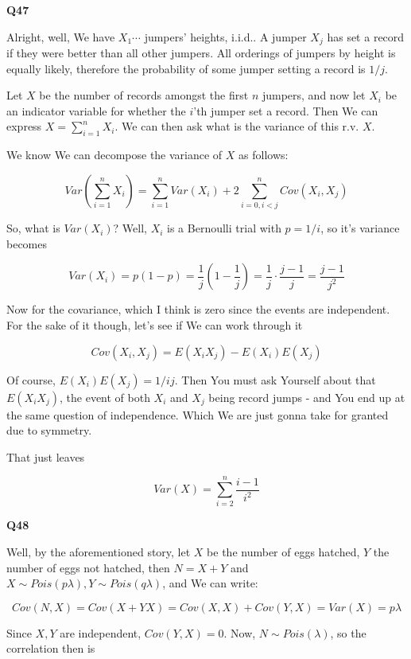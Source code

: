 \documentclass{article}
\begin{document}
			\hfill
			
		\textbf{Q47}
		
			Alright, well, We have $X_1\cdots$ jumpers' heights, i.i.d.. A jumper $X_j$ has set a record if they were better than all other jumpers. All orderings of jumpers by height is equally likely, therefore the probability of some jumper setting a record is $1/j$.
			
			Let $X$ be the number of records amongst the first $n$ jumpers, and now let $X_i$ be an indicator variable for whether the $i$'th jumper set a record. Then We can express $X = \sum^n_{i=1} X_i$. We can then ask what is the variance of this r.v. $X$.
			
			We know We can decompose the variance of $X$ as follows:
			
			\[ Var\left( \sum^n_{i=1} X_i \right) = \sum^n_{i=1} Var(X_i) + 2\sum^n_{i=0, i<j} Cov(X_i, X_j)  \]
			
			So, what is $Var(X_i)$? Well, $X_i$ is a Bernoulli trial with $p=1/i$, so it's variance becomes
			
			\[ Var(X_i) = p(1-p) = \frac{1}{j}\left(1-\frac{1}{j} \right) = \frac{1}{j}\cdot\frac{j-1}{j} = \frac{j-1}{j^2} \]
			
			Now for the covariance, which I think is zero since the events are independent. For the sake of it though, let's see if We can work through it
			
			\[ Cov(X_i, X_j) = E(X_iX_j) - E(X_i)E(X_j)  \]
			
			Of course, $E(X_i)E(X_j) = 1/ij$. Then You must ask Yourself about that $E(X_iX_j)$, the event of both $X_i$ and $X_j$ being record jumps - and You end up at the same question of independence. Which We are just gonna take for granted due to symmetry.
			
			That just leaves
			
			\[ Var(X) = \sum^n_{i=2} \frac{i-1}{i^2} \]
			
			\hfill
			
		\textbf{Q48}
		
			Well, by the aforementioned story, let $X$ be the number of eggs hatched, $Y$ the number of eggs not hatched, then $N = X+Y$ and $X\sim Pois(p\lambda), Y\sim Pois(q\lambda)$, and We can write:
			
			\[ Cov(N, X) = Cov(X+Y X) = Cov(X, X) + Cov(Y, X) = Var(X) = p\lambda \]

			Since $X, Y$ are independent, $Cov(Y, X) = 0$. Now, $N\sim Pois(\lambda)$, so the correlation then is
			
\end{document}

